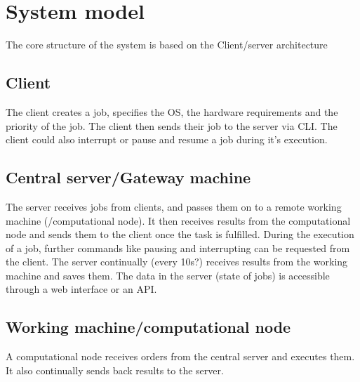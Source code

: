 \section{System model}
The core structure of the system is based on the Client/server architecture %

\subsection{Client}
The client creates a job, specifies the OS, the hardware requirements and the priority of the job. The client then sends their job to the server via CLI. \newline
The client could also interrupt or pause and resume a job during it's execution.

\subsection{Central server/Gateway machine}
The server receives jobs from clients, and passes them on to a remote working machine (/computational node). \newline
It then receives results from the computational node and sends them to the client once the task is fulfilled. \newline
During the execution of a job, further commands like pausing and interrupting can be requested from the client. \newline
The server continually (every 10s?) receives results from the working machine and saves them. \newline
The data in the server (state of jobs) is accessible through a web interface or an API.

\subsection{Working machine/computational node}
A computational node receives orders from the central server and executes them. It also continually sends back results to the server.